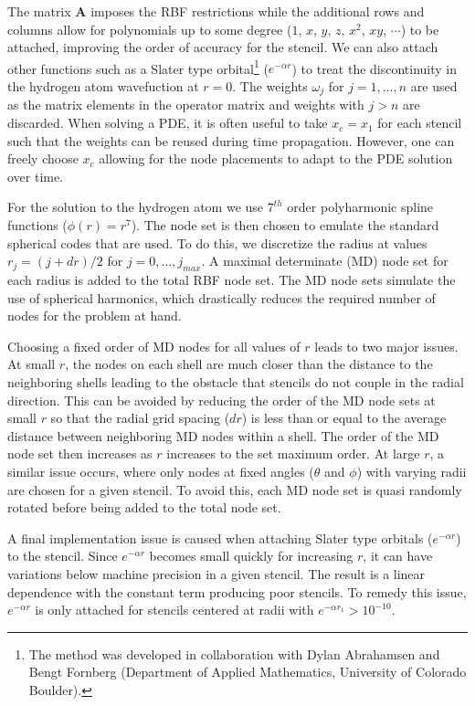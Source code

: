 The matrix $\mathbf{A}$ imposes the RBF restrictions while the additional rows and columns allow for polynomials up to some degree ($1$, $x$, $y$, $z$, $x^2$, $xy$, $\cdots$) to be attached, improving the order of accuracy for the stencil. We can also attach other functions such as a Slater type orbital\footnote{The method was developed in collaboration with Dylan Abrahamsen and Bengt Fornberg (Department of Applied Mathematics, University of Colorado Boulder).} ($e^{-\alpha r}$) to treat the discontinuity in the hydrogen atom wavefuction at $r=0$. The weights $\omega_j$ for $j=1, \dots, n$ are used as the matrix elements in the operator matrix and weights with $j>n$ are discarded. When solving a PDE, it is often useful to take $x_c=x_1$ for each stencil such that the weights can be reused during time propagation. However, one can freely choose $x_c$ allowing for the node placements to adapt to the PDE solution over time. 

For the solution to the hydrogen atom we use $7^{th}$ order polyharmonic spline functions ($\phi(r)=r^7$). The node set is then chosen to emulate the standard spherical codes that are used. To do this, we discretize the radius at values $r_j=(j+dr)/2$ for $j=0, \dots, j_{max}$. A maximal determinate (MD) node set \cite{Womersley2007} for each radius is added to the total RBF node set. The MD node sets simulate the use of spherical harmonics, which drastically reduces the required number of nodes for the problem at hand. 

Choosing a fixed order of MD nodes for all values of $r$ leads to two major issues. At small $r$, the nodes on each shell are much closer than the distance to the neighboring shells leading to the obstacle that stencils do not couple in the radial direction. This can be avoided by reducing the order of the MD node sets at small $r$ so that the radial grid spacing ($dr$) is less than or equal to the average distance between neighboring MD nodes within a shell. The order of the MD node set then increases as $r$ increases to the set maximum order. At large $r$, a similar issue occurs, where only nodes at fixed angles ($\theta$ and $\phi$) with varying radii are chosen for a given stencil. To avoid this, each MD node set is quasi randomly rotated before being added to the total node set. 

A final implementation issue is caused when attaching Slater type orbitals ($e^{-\alpha r}$) to the stencil. Since $e^{-\alpha r}$ becomes small quickly for increasing $r$, it can have variations below machine precision in a given stencil. The result is a linear dependence with the constant term producing poor stencils. To remedy this issue, $e^{-\alpha r}$ is only attached for stencils centered at radii with $e^{-\alpha r_1}>10^{-10}$.

